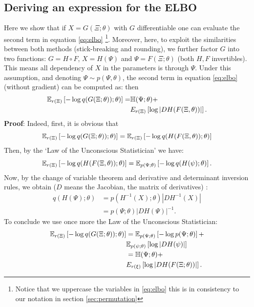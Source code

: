 \documentclass[twoside]{article}
\begin{document}
\subsection*{Deriving an expression for the ELBO}
Here we show that if $X=G(\Xi;\theta)$ with $G$ differentiable one can evaluate the second term in equation \eqref{eq:elbo} \footnote{Notice that we uppercase the variables in \eqref{eq:elbo} this is in consistency to our notation in section \ref{sec:permutation}}. Moreover, here, to exploit the similarities between both methods (stick-breaking and rounding), we further factor $G$ into two functions: $G=H \circ F$, $X = H(\Psi)$ and $\Psi = F(\Xi; \theta)$ (both $H,F$ invertibles). This means all dependency of $X$ in the parameters is through $\Psi$. Under this assumption, and denoting $\Psi\sim p(\Psi,\theta)$, the second term in equation \eqref{eq:elbo} (without gradient) can be computed as:
 then \begin{align} \nonumber
\mathbb{E}_{r(\Xi)} \left[- \log q(G(\Xi;\theta)); \theta) \right] = & \mathbb{H}(\Psi; \theta) +\\ \nonumber & E_{r(\Xi)}\left[\log | DH(F(\Xi,\theta))|\right].\end{align}
\textbf{Proof}:
Indeed, first, it is obvious that $$\mathbb{E}_{r(\Xi)} \left[- \log q(G(\Xi;\theta)); \theta) \right] = \mathbb{E}_{r(\Xi)} \left[- \log q(H(F(\Xi,\theta)); \theta) \right] $$
Then, by the `Law of the Unconscious Statistician' we have:
 $$\mathbb{E}_{r(\Xi)} \left[- \log q(H(F(\Xi,\theta)); \theta) \right] = \mathbb{E}_{p(\Psi;\theta)} \left[- \log q(H(\psi); \theta) \right]. $$
Now, by the change of variable theorem and derivative and determinant inversion rules, we obtain ($D$ means the Jacobian, the matrix of derivatives) :\begin{align}
\nonumber q(H(\Psi); \theta) & = p(H^{-1}(X) ;\theta)  |DH ^{-1}(X) | \\ \nonumber
 & = p(\Psi; \theta) | DH (\Psi) | ^{-1}.
 \end{align}
 To conclude we use once more the Law of the Unconscious Statistician:
 \begin{eqnarray}
\nonumber \mathbb{E}_{r(\Xi)} \left[- \log q(G(\Xi;\theta)); \theta) \right]  &= \mathbb{E}_{p(\Psi;\theta)}\left[ - \log p(\Psi;\theta)\right] +   \\ & \nonumber \mathbb{E}_{p(\psi;\theta)}\left[\log | DH(\psi)|\right] \\ \label{eq:elbo2} 
 &= \mathbb{H}(\Psi; \theta)+ \\ \nonumber & E_{r(\xi)}\left[\log | DH(F(\Xi;\theta))|\right].\end{eqnarray}
 
\end{document}
